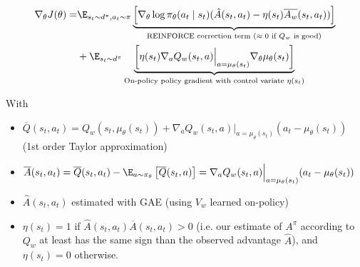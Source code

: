 \begin{align}
    \nabla_\theta J(\theta) = 
    & \E_{s_t\sim d^\pi, a_t \sim \pi} \underbrace{
        \left[
            \nabla_\theta \log \pi_\theta(a_t\mid s_t) (\hat{A}(s_t,a_t) - \eta(s_t) \overline{A_w}(s_t,a_t))
        \right]
    }_{
        \text{REINFORCE correction term ($\approx 0$ if $Q_w$ is good)}
    }
    \nonumber \\
    & + \E_{s_t\sim d^\pi} \underbrace{
        \left[
            \eta(s_t) \nabla_a Q_w(s_t,a) \Bigr|_{a=\mu_\theta(s_t)} \nabla_\theta \mu_\theta(s_t)
        \right]
    }_{
        \text{On-policy policy gradient with control variate $\eta(s_t)$}
    }
\end{align}

With
\begin{itemize}
    \item $\overline{Q}(s_t,a_t) = Q_w(s_t, \mu_\theta(s_t)) + \nabla_a Q_w(s_t,a) \Bigr|_{a=\mu_\theta(s_t)}(a_t-\mu_\theta(s_t))$ (1st order Taylor approximation)
    \item $\overline{A}(s_t,a_t) = \overline{Q}(s_t,a_t) - \E_{a \sim \pi_\theta}\left[\overline{Q}(s_t,a)\right] = \nabla_a Q_w(s_t, a) \Bigr|_{a=\mu_\theta(s_t)} (a_t-\mu_\theta(s_t))$
    \item $\hat{A}(s_t,a_t)$ estimated with GAE (using $V_w$ learned on-policy)
    \item $\eta(s_t) = 1$ if $\hat{A}(s_t,a_t) \overline{A}(s_t,a_t) > 0$ (i.e. our estimate of $A^\pi$ according to $Q_w$ at least has the same sign than the observed advantage $\hat{A}$), and $\eta(s_t) = 0$ otherwise.
\end{itemize}